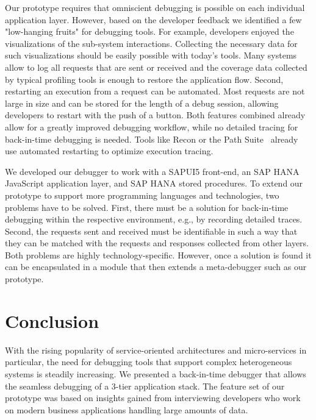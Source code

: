 Our prototype requires that omniscient debugging is possible on each individual application layer.
However, based on the developer feedback we identified a few "low-hanging fruits" for debugging tools.
For example, developers enjoyed the visualizations of the sub-system interactions.
Collecting the necessary data for such visualizations should be easily possible with today's tools.
Many systems allow to log all requests that are sent or received and the coverage data collected by typical profiling tools is enough to restore the application flow.
Second, restarting an execution from a request can be automated.
Most requests are not large in size and can be stored for the length of a debug session, allowing developers to restart with the push of a button.
Both features combined already allow for a greatly improved debugging workflow, while no detailed tracing for back-in-time debugging is needed.
Tools like Recon or the Path Suite~\cite{lee11:unified_debugging_of_distributed, perscheid13:test-driven_fault_navigation} already use automated restarting to optimize execution tracing.

We developed our debugger to work with a SAPUI5 front-end, an SAP HANA JavaScript application layer, and SAP HANA stored procedures.
To extend our prototype to support more programming languages and technologies, two problems have to be solved.
First, there must be a solution for back-in-time debugging within the respective environment, e.g., by recording detailed traces.
Second, the requests sent and received must be identifiable in such a way that they can be matched with the requests and responses collected from other layers.
Both problems are highly technology-specific. 
However, once a solution is found it can be encapsulated in a module that then extends a meta-debugger such as our prototype.

\section{Conclusion}
\label{sec:conclusion}

With the rising popularity of service-oriented architectures and micro-services in particular, the need for debugging tools that support complex heterogeneous systems is steadily increasing.
We presented a back-in-time debugger that allows the seamless debugging of a 3-tier application stack.
The feature set of our prototype was based on insights gained from interviewing developers who work on modern business applications handling large amounts of data.

